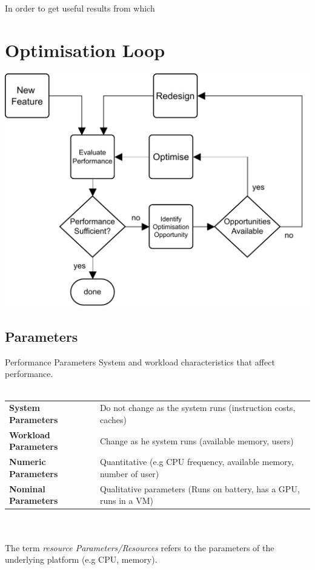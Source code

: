 In order to get useful results from which 

\section{Optimisation Loop}
\begin{center}
    \includegraphics[width=.6\textwidth]{introduction/images/optimisation_loop.drawio.pdf}
\end{center}

\subsection{Parameters}
\begin{definitionbox}{Performance Parameters}
    System and workload characteristics that affect performance.
     \\
     \\ \begin{tabular}{l p{}}
        \textbf{System Parameters} & Do not change as the system runs (instruction costs, caches) \\
        \textbf{Workload Parameters} & Change as he system runs (available memory, users) \\
        \textbf{Numeric Parameters} & Quantitative (e.g CPU frequency, available memory, number of user) \\
        \textbf{Nominal Parameters} & Qualitative parameters (Runs on battery, has a GPU, runs in a VM) \\
    \end{tabular}
    \\ 
    \\ The term \textit{resource Parameters/Resources} refers to the parameters of the underlying platform (e.g CPU, memory).
\end{definitionbox}

\unfinished

